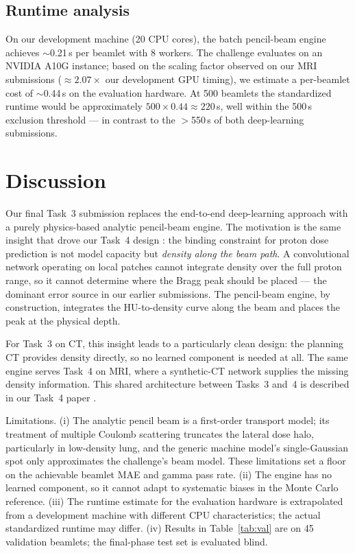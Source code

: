\documentclass[runningheads]{llncs}
\begin{document}
\subsection{Runtime analysis}
On our development machine (20 CPU cores), the batch pencil-beam engine achieves $\sim$0.21\,s per beamlet with 8 workers. The challenge evaluates on an NVIDIA A10G instance; based on the scaling factor observed on our MRI submissions ($\approx 2.07\times$ our development GPU timing), we estimate a per-beamlet cost of $\sim$0.44\,s on the evaluation hardware. At 500 beamlets the standardized runtime would be approximately $500 \times 0.44 \approx 220$\,s, well within the 500\,s exclusion threshold --- in contrast to the $>$550\,s of both deep-learning submissions.

\section{Discussion}
Our final Task~3 submission replaces the end-to-end deep-learning approach with a purely physics-based analytic pencil-beam engine. The motivation is the same insight that drove our Task~4 design \cite{doserad_t4}: the binding constraint for proton dose prediction is not model capacity but \emph{density along the beam path}. A convolutional network operating on local patches cannot integrate density over the full proton range, so it cannot determine where the Bragg peak should be placed --- the dominant error source in our earlier submissions. The pencil-beam engine, by construction, integrates the HU-to-density curve along the beam and places the peak at the physical depth.

For Task~3 on CT, this insight leads to a particularly clean design: the planning CT provides density directly, so no learned component is needed at all. The same engine serves Task~4 on MRI, where a synthetic-CT network supplies the missing density information. This shared architecture between Tasks~3 and~4 is described in our Task~4 paper \cite{doserad_t4}.

Limitations. (i) The analytic pencil beam is a first-order transport model; its treatment of multiple Coulomb scattering truncates the lateral dose halo, particularly in low-density lung, and the generic machine model's single-Gaussian spot only approximates the challenge's beam model. These limitations set a floor on the achievable beamlet MAE and gamma pass rate. (ii) The engine has no learned component, so it cannot adapt to systematic biases in the Monte Carlo reference. (iii) The runtime estimate for the evaluation hardware is extrapolated from a development machine with different CPU characteristics; the actual standardized runtime may differ. (iv) Results in Table~\ref{tab:val} are on 45 validation beamlets; the final-phase test set is evaluated blind.
\end{document}
